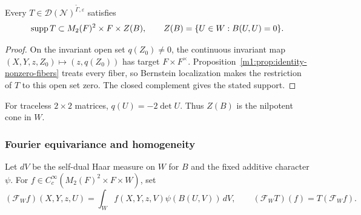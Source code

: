 \begin{corollary}\label{m1:cor:identity-support}
Every $T\in\mathcal D(\mathcal N)^{\widetilde\Gamma,\varepsilon}$
satisfies
\begin{equation}\label{m1:eq:identity-first-support}
 \operatorname{supp} T\subset M_2(F)^2\times F\times Z(B),
 \qquad Z(B)=\{U\in W:B(U,U)=0\}.
\end{equation}
\end{corollary}
\begin{proof}
On the invariant open set $q(Z_0)\neq0$, the continuous invariant map
$(X,Y,z,Z_0)\mapsto(z,q(Z_0))$ has target $F\times F^\times$.
Proposition~\ref{m1:prop:identity-nonzero-fibers} treats every
fiber, so Bernstein localization makes the restriction of $T$ to this
open set zero. The closed complement gives the stated support.
\end{proof}
For traceless $2\times2$ matrices, $q(U)=-2\det U$. Thus $Z(B)$ is
the nilpotent cone in $W$.

\subsubsection{Fourier equivariance and homogeneity}
\label{m1:subsec:identity-Fourier}
Let $dV$ be the self-dual Haar measure on $W$ for $B$ and the fixed
additive character $\psi$. For
$f\in C_c^\infty(M_2(F)^2\times F\times W)$, set
\begin{equation}\label{m1:eq:partial-Fourier}
 (\mathcal F_W f)(X,Y,z,U)
 =\int_W f(X,Y,z,V)\psi(B(U,V))\,dV,
 \qquad (\mathcal F_WT)(f)=T(\mathcal F_Wf).
\end{equation}


